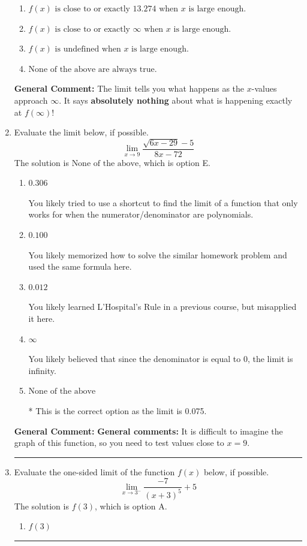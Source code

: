 \documentclass{extbook}[14pt]
\newcommand{\litem}[1]{\item #1

\rule{\textwidth}{0.4pt}}
\begin{document}
\begin{enumerate}
{\begin{enumerate}[label=\Alph*.]
\item \( f(x) \text{ is close to or exactly } 13.274 \text{ when } x \text{ is large enough}. \)


\item \( f(x) \text{ is close to or exactly } \infty \text{ when } x \text{ is large enough}. \)


\item \( f(x) \text{ is undefined when } x \text{ is large enough}. \)


\item \( \text{None of the above are always true.} \)


\end{enumerate}

\textbf{General Comment:} The limit tells you what happens as the $x$-values approach $\infty$. It says \textbf{absolutely nothing} about what is happening exactly at $f(\infty)$!
}
\litem{
Evaluate the limit below, if possible.
\[ \lim_{x \rightarrow 9} \frac{\sqrt{6x - 29} - 5}{8x - 72} \]The solution is \( \text{None of the above} \), which is option E.\begin{enumerate}[label=\Alph*.]
\item \( 0.306 \)

You likely tried to use a shortcut to find the limit of a function that only works for when the numerator/denominator are polynomials.
\item \( 0.100 \)

You likely memorized how to solve the similar homework problem and used the same formula here.
\item \( 0.012 \)

You likely learned L'Hospital's Rule in a previous course, but misapplied it here.
\item \( \infty \)

You likely believed that since the denominator is equal to 0, the limit is infinity.
\item \( \text{None of the above} \)

* This is the correct option as the limit is 0.075.
\end{enumerate}

\textbf{General Comment:} \textbf{General comments:} It is difficult to imagine the graph of this function, so you need to test values close to $x = 9$.
}
\litem{
Evaluate the one-sided limit of the function $f(x)$ below, if possible.
\[ \lim_{x \rightarrow 3^-} \frac{-7}{(x+3)^5}+5 \]The solution is \( f(3) \), which is option A.\begin{enumerate}[label=\Alph*.]
\item \( f(3) \)



\end{enumerate}}
\end{enumerate}
\end{document}
